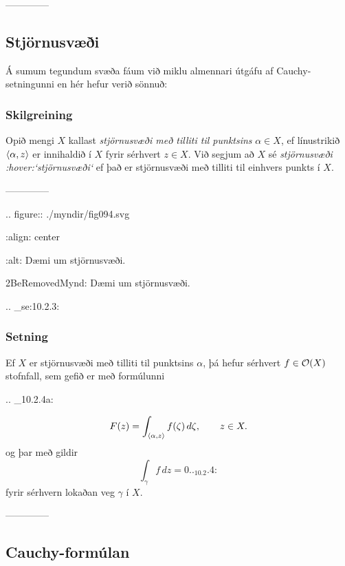 --------------





\subsection*{Stjörnusvæði}


Á sumum tegundum svæða fáum við miklu almennari útgáfu af
Cauchy-setningunni en hér hefur verið sönnuð: 

\subsubsection{Skilgreining}
Opið mengi $X$ kallast {\it stjörnusvæði með tilliti til punktsins }
$\alpha\in X$, ef línustrikið ${\langle\alpha,z\rangle}$ er innihaldið í $X$
fyrir sérhvert $z\in X$.  Við segjum að $X$ sé {\it
stjörnusvæði :hover:`stjörnusvæði`} ef
það er stjörnusvæði með tilliti til einhvers punkts í $X$.


--------------



.. figure:: ./myndir/fig094.svg

    :align: center

    :alt: Dæmi  um stjörnusvæði.

    2BeRemovedMynd: Dæmi  um stjörnusvæði.



.. _se:10.2.3:

\subsubsection{Setning} 
Ef $X$ er stjörnusvæði með tilliti til punktsins $\alpha$, 
þá hefur sérhvert $f\in {\cal O}(X)$ stofnfall, sem
gefið er með formúlunni

.. _10.2.4a:

\begin{equation*}
F(z)=\int_{{\langle\alpha,z\rangle}} f(\zeta)\, d\zeta, \qquad z\in X.
\end{equation*}
og
þar með gildir 
\begin{equation*}\int_\gamma f\, dz =0


.. _10.2.4:

 \end{equation*}
fyrir sérhvern lokaðan veg $\gamma$ í $X$.


--------------



\subsection*{Cauchy-formúlan}


